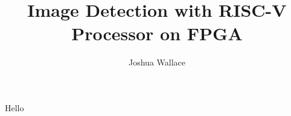 \documentclass[12pt]{article}
\title{Image Detection with RISC-V Processor on FPGA}
\author{Joshua Wallace}
\begin{document}
\frontmatter
\maketitle
\newpage

\mainmatter
Hello





% 


% 
\end{document}
